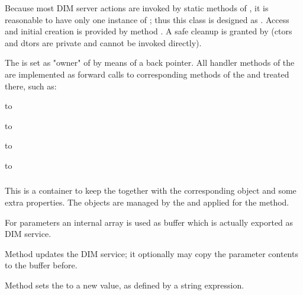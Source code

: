 \begin{compactenum}

\item Because most DIM server actions are invoked by static methods of , it is reasonable to have only one instance of ; 
thus this class is designed as . Access and initial creation is provided by method . A safe cleanup is granted by  (ctors and dtors are private and cannot be invoked directly).

\item The  is set as "owner" of  by means
of a back pointer. All handler methods of the  are
implemented as forward calls to corresponding methods of the 
 and treated there, such as:
\bcir
	\item {} to 
	\item {} to 
	\item {} to 
	\item {} to 
\ecir


    
\end{compactenum}

    
\subsubsection{}
This is a container to keep the  together with 
the corresponding  object and some extra properties.
The  objects are managed by the
 and applied for the 
  method.


\begin{compactenum} 

\item For  parameters an internal  array is used as buffer which is actually exported as DIM service.

\item Method  updates the DIM service; it optionally may copy the
parameter contents to the buffer before.

\item Method  sets the  to a new value, as defined by a string expression.

\end{compactenum}


